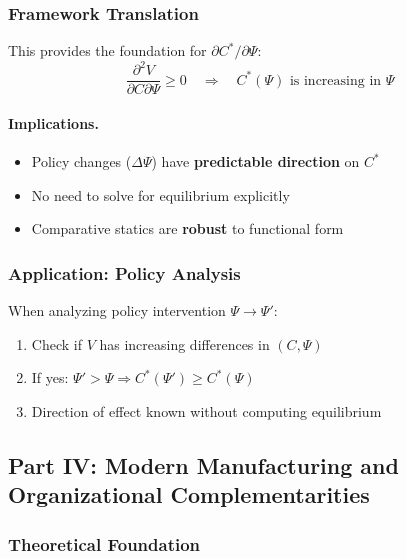 \subsubsection{Framework Translation}

This provides the foundation for $\partial C^* / \partial \Psi$:
\begin{equation}
\frac{\partial^2 V}{\partial C \partial \Psi} \geq 0 \quad \Rightarrow \quad 
C^*(\Psi) \text{ is increasing in } \Psi
\end{equation}

\paragraph{Implications.}
\begin{itemize}
    \item Policy changes ($\Delta \Psi$) have \textbf{predictable direction} on $C^*$
    \item No need to solve for equilibrium explicitly
    \item Comparative statics are \textbf{robust} to functional form
\end{itemize}

\subsubsection{Application: Policy Analysis}

When analyzing policy intervention $\Psi \to \Psi'$:
\begin{enumerate}
    \item Check if $V$ has increasing differences in $(C, \Psi)$
    \item If yes: $\Psi' > \Psi \Rightarrow C^*(\Psi') \geq C^*(\Psi)$
    \item Direction of effect known without computing equilibrium
\end{enumerate}

\subsection{Part IV: Modern Manufacturing and Organizational Complementarities}

\subsubsection{Theoretical Foundation}

